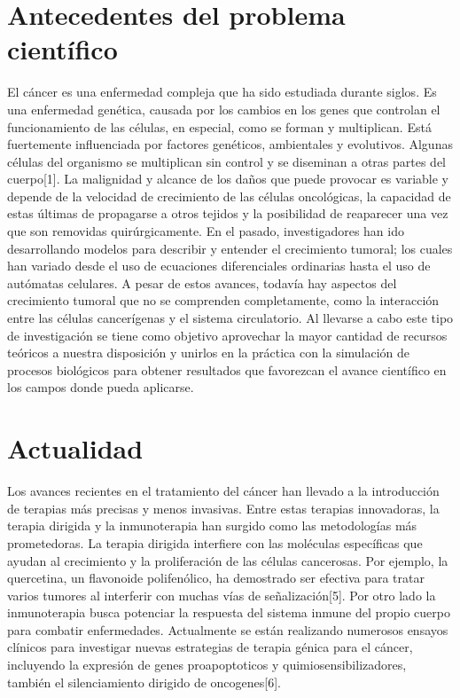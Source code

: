 \section{Antecedentes del problema científico}
\hspace{.1cm}El cáncer es una enfermedad compleja que ha sido estudiada durante siglos. Es una enfermedad genética, causada por los cambios en los genes que controlan el funcionamiento de las células, en especial, como se forman y multiplican. Está fuertemente influenciada por factores genéticos, ambientales y evolutivos. Algunas células del organismo se multiplican sin control y se diseminan a otras partes del cuerpo[1]. La malignidad y alcance de los daños que puede provocar es variable y depende de la velocidad de crecimiento de las células oncológicas, la capacidad de estas últimas de propagarse a otros tejidos y la posibilidad de reaparecer una vez que son removidas quirúrgicamente. En el pasado, investigadores han ido desarrollando modelos para describir y entender el crecimiento tumoral; los cuales han variado desde el uso de ecuaciones diferenciales ordinarias hasta el uso de autómatas celulares. A pesar de estos avances, todavía hay aspectos del crecimiento tumoral que no se comprenden completamente, como la interacción entre las células cancerígenas y el sistema circulatorio. Al llevarse a cabo este tipo de investigación se tiene como objetivo aprovechar la mayor cantidad de recursos teóricos a nuestra disposición y unirlos en la práctica con la simulación de procesos biológicos para obtener resultados que favorezcan el avance científico en los campos donde pueda aplicarse.

\section{Actualidad} 
\hspace{.1cm}Los avances recientes en el tratamiento del cáncer han llevado a la introducción de terapias más precisas y menos invasivas. Entre estas terapias innovadoras, la terapia dirigida y la inmunoterapia han surgido como las metodologías más prometedoras. La terapia dirigida interfiere con las moléculas específicas que ayudan al crecimiento y la proliferación de las células cancerosas. Por ejemplo, la quercetina, un flavonoide polifen\'olico, ha demostrado ser efectiva para tratar varios tumores al interferir con muchas vías de señalización[5]. Por otro lado la inmunoterapia busca potenciar la respuesta del sistema inmune del propio cuerpo para combatir enfermedades. Actualmente se están realizando numerosos ensayos clínicos para investigar nuevas estrategias de terapia génica para el cáncer, incluyendo la expresión de genes proapoptoticos y quimiosensibilizadores, también el silenciamiento dirigido de oncogenes[6].


